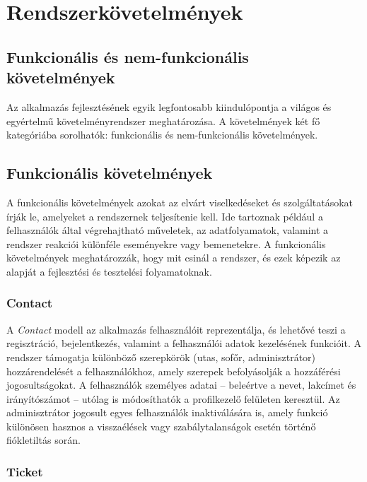 \section{Rendszerkövetelmények}

\subsection{Funkcionális és nem-funkcionális követelmények}

\indent Az alkalmazás fejlesztésének egyik legfontosabb kiindulópontja a világos és egyértelmű követelményrendszer meghatározása. A követelmények két fő kategóriába sorolhatók: funkcionális és nem-funkcionális követelmények. 

\subsection{Funkcionális követelmények}

A funkcionális követelmények azokat az elvárt viselkedéseket és szolgáltatásokat írják le, amelyeket a rendszernek teljesítenie kell. Ide tartoznak például a felhasználók által végrehajtható műveletek, az adatfolyamatok, valamint a rendszer reakciói különféle eseményekre vagy bemenetekre. A funkcionális követelmények meghatározzák, hogy mit csinál a rendszer, és ezek képezik az alapját a fejlesztési és tesztelési folyamatoknak.


\subsubsection{Contact}

A \textit{Contact} modell az alkalmazás felhasználóit reprezentálja, és lehetővé teszi a regisztráció, bejelentkezés, valamint a felhasználói adatok kezelésének funkcióit. A rendszer támogatja különböző szerepkörök (utas, sofőr, adminisztrátor) hozzárendelését a felhasználókhoz, amely szerepek befolyásolják a hozzáférési jogosultságokat. A felhasználók személyes adatai – beleértve a nevet, lakcímet és irányítószámot – utólag is módosíthatók a profilkezelő felületen keresztül. Az adminisztrátor jogosult egyes felhasználók inaktiválására is, amely funkció különösen hasznos a visszaélések vagy szabálytalanságok esetén történő fiókletiltás során.

\subsubsection{Ticket}


